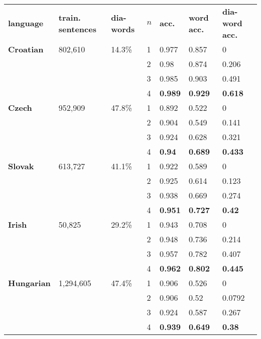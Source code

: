 \documentclass[12pt]{article}
\begin{document}
    \begin{table}[measurements]
        \begin{tabular}{|l|l|l||l|l|l|l|}
            \hline
            \textbf{language} & \textbf{train. sentences} & \textbf{dia-words} & $n$ & \textbf{acc.} & \textbf{word acc.} & \textbf{dia-word acc.} \\
            \hhline{|=|=|=#=|=|=|=|}
            \textbf{Croatian} & 802,610 & 14.3\% & 1 & 0.977 & 0.857 & 0\\ \cline{4-7}
            & & & 2 & 0.98 & 0.874 & 0.206\\ \cline{4-7}
            & & & 3 & 0.985 & 0.903 & 0.491\\ \cline{4-7}
            & & & 4 & \textbf{0.989} & \textbf{0.929} & \textbf{0.618}\\ \cline{4-7}
            \hline
            \textbf{Czech} & 952,909 & 47.8\% & 1 & 0.892 & 0.522 & 0\\ \cline{4-7}
            & & & 2 & 0.904 & 0.549 & 0.141\\ \cline{4-7}
            & & & 3 & 0.924 & 0.628 & 0.321\\ \cline{4-7}
            & & & 4 & \textbf{0.94} & \textbf{0.689} & \textbf{0.433}\\ \cline{4-7}
            \hline
            \textbf{Slovak} & 613,727 & 41.1\% & 1 & 0.922 & 0.589 & 0\\ \cline{4-7}
            & & & 2 & 0.925 & 0.614 & 0.123\\ \cline{4-7}
            & & & 3 & 0.938 & 0.669 & 0.274\\ \cline{4-7}
            & & & 4 & \textbf{0.951} & \textbf{0.727} & \textbf{0.42}\\ \cline{4-7}
            \hline
            \textbf{Irish} & 50,825 & 29.2\% & 1 & 0.943 & 0.708 & 0\\ \cline{4-7}
            & & & 2 & 0.948 & 0.736 & 0.214\\ \cline{4-7}
            & & & 3 & 0.957 & 0.782 & 0.407\\ \cline{4-7}
            & & & 4 & \textbf{0.962} & \textbf{0.802} & \textbf{0.445}\\ \cline{4-7}
            \hline
            \textbf{Hungarian} & 1,294,605 & 47.4\% & 1 & 0.906 & 0.526 & 0\\ \cline{4-7}
            & & & 2 & 0.906 & 0.52 & 0.0792\\ \cline{4-7}
            & & & 3 & 0.924 & 0.587 & 0.267\\ \cline{4-7}
            & & & 4 & \textbf{0.939} & \textbf{0.649} & \textbf{0.38}\\ \cline{4-7}

\end{tabular}
\end{table}
\end{document}
